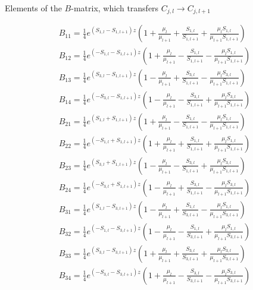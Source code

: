 \documentclass[%
 reprint,
 amsmath,
 amssymb,
 aps,
 prl,
 lengthcheck,%
]{revtex4-1}
\begin{document}
\begin{table}
\caption{Elements of the $B$-matrix, which transfers $C_{j,l} \rightarrow C_{j,l+1}$}

\begin{equation}
\begin{array}{l}
  B_{11} = \frac{1}{4} e^{(S_{1,l} - S_{1,l+1})z}\left( 1 + \frac{\mu_l}{\mu_{l+1}} + \frac{S_{1,l}}{S_{1,l+1}} + \frac{\mu_l S_{1,l}}{\mu_{l+1} S_{1,l+1}} \right)\\
  B_{12} = \frac{1}{4} e^{(-S_{1,l} - S_{1,l+1})z}\left( 1 + \frac{\mu_l}{\mu_{l+1}} - \frac{S_{1,l}}{S_{1,l+1}} - \frac{\mu_l S_{1,l}}{\mu_{l+1} S_{1,l+1}} \right)\\
  B_{13} = \frac{1}{4} e^{(S_{3,l} - S_{1,l+1})z}\left( 1 - \frac{\mu_l}{\mu_{l+1}} + \frac{S_{3,l}}{S_{1,l+1}} - \frac{\mu_l S_{3,l}}{\mu_{l+1} S_{1,l+1}} \right)\\
  B_{14} = \frac{1}{4} e^{(-S_{3,l} - S_{1,l+1})z}\left( 1 - \frac{\mu_l}{\mu_{l+1}} - \frac{S_{3,l}}{S_{1,l+1}} + \frac{\mu_l S_{3,l}}{\mu_{l+1} S_{1,l+1}} \right)\\[1em]
  
  B_{21} = \frac{1}{4} e^{(S_{1,l} + S_{1,l+1})z}\left( 1 + \frac{\mu_l}{\mu_{l+1}} - \frac{S_{1,l}}{S_{1,l+1}} - \frac{\mu_l S_{1,l}}{\mu_{l+1} S_{1,l+1}} \right)\\
  B_{22} = \frac{1}{4} e^{(-S_{1,l} + S_{1,l+1})z}\left( 1 + \frac{\mu_l}{\mu_{l+1}} + \frac{S_{1,l}}{S_{1,l+1}} + \frac{\mu_l S_{1,l}}{\mu_{l+1} S_{1,l+1}} \right)\\
  B_{23} = \frac{1}{4} e^{(S_{3,l} + S_{1,l+1})z}\left( 1 - \frac{\mu_l}{\mu_{l+1}} - \frac{S_{3,l}}{S_{1,l+1}} + \frac{\mu_l S_{3,l}}{\mu_{l+1} S_{1,l+1}} \right)\\
  B_{24} = \frac{1}{4} e^{(-S_{3,l} + S_{1,l+1})z}\left( 1 - \frac{\mu_l}{\mu_{l+1}} + \frac{S_{3,l}}{S_{1,l+1}} - \frac{\mu_l S_{3,l}}{\mu_{l+1} S_{1,l+1}} \right)\\[1em]
  
  B_{31} = \frac{1}{4} e^{(S_{1,l} - S_{3,l+1})z}\left( 1 - \frac{\mu_l}{\mu_{l+1}} + \frac{S_{1,l}}{S_{3,l+1}} - \frac{\mu_l S_{1,l}}{\mu_{l+1} S_{3,l+1}} \right)\\
  B_{32} = \frac{1}{4} e^{(-S_{1,l} - S_{3,l+1})z}\left( 1 - \frac{\mu_l}{\mu_{l+1}} - \frac{S_{1,l}}{S_{3,l+1}} + \frac{\mu_l S_{1,l}}{\mu_{l+1} S_{3,l+1}} \right)\\
  B_{33} = \frac{1}{4} e^{(S_{3,l} - S_{3,l+1})z}\left( 1 + \frac{\mu_l}{\mu_{l+1}} + \frac{S_{3,l}}{S_{3,l+1}} + \frac{\mu_l S_{3,l}}{\mu_{l+1} S_{3,l+1}} \right)\\
  B_{34} = \frac{1}{4} e^{(-S_{3,l} - S_{3,l+1})z}\left( 1 + \frac{\mu_l}{\mu_{l+1}} - \frac{S_{3,l}}{S_{3,l+1}} - \frac{\mu_l S_{3,l}}{\mu_{l+1} S_{3,l+1}} \right)\\[1em]
  

\end{array}
\end{equation}
\end{table}
\end{document}
